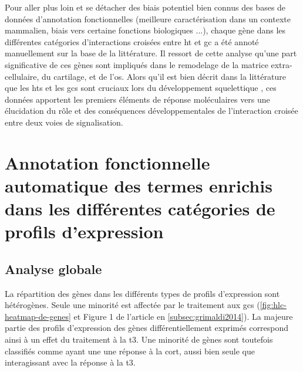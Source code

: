\documentclass[../main.tex]{subfiles}
\begin{document}
	Pour aller plus loin et se détacher des biais potentiel bien connus des bases de données d'annotation fonctionnelles (meilleure caractérisation dans un contexte mammalien, biais vers certaine fonctions biologiques ...), chaque gène dans les différentes catégories d'interactions croisées entre \gls{ht} et \gls{gc} a été annoté manuellement sur la base de la littérature.
	Il ressort de cette analyse qu'une part significative de ces gènes sont impliqués dans le remodelage de la matrice extra-cellulaire, du cartilage, et de l'os.
	Alors qu'il est bien décrit dans la littérature que les \glspl{ht} et les \glspl{gc} sont cruciaux lors du développement squelettique \citep{Robson2002,Wojcicka2013a}, ces données apportent les premiers éléments de réponse moléculaires vers une élucidation du rôle et des conséquences développementales de l'interaction croisée entre deux voies de signalisation.




		
		
		





\section{Annotation fonctionnelle automatique des termes enrichis dans les différentes catégories de profils d'expression}\label{sec:hlc-preanalysis}


	\subsection{Analyse globale}
		La répartition des gènes dans les différents types de profils d'expression sont hétérogènes.
		Seule une minorité est affectée par le traitement aux \glspl{gc} (\autoref{fig:hlc-heatmap-de-genes} et Figure 1 de l'article en \autoref{subsec:grimaldi2014}).
		La majeure partie des profils d'expression des gènes différentiellement exprimés correspond ainsi à un effet du traitement à la \gls{t3}.
		Une minorité de gènes sont toutefois classifiés comme ayant une une réponse à la \gls{cort}, aussi bien seule que interagissant avec la réponse à la \gls{t3}.
\end{document}
